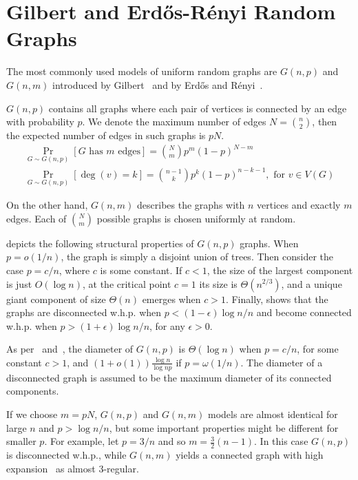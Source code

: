 \section{Gilbert and \texorpdfstring{Erd\H{o}s-R\'enyi}{Erdos-Renyi} Random Graphs}

The most commonly used models of uniform random graphs are $G(n,p)$ and $G(n,m)$
introduced by Gilbert~\cite{gil59} and by Erd\H{o}s and R\'enyi~\cite{er59}.

$G(n,p)$ contains all graphs where each pair of vertices
is connected by an edge with probability $p$.
We denote the maximum number of edges $N=\binom{n}{2}$,
then the expected number of edges in such graphs is $pN$.
\begin{gather}
    \Pr_{G\sim G(n,p)}[G\text{ has }m\text{ edges}]=\binom{N}{m}p^m(1-p)^{N-m}\\
    \Pr_{G\sim G(n,p)}[\deg(v)=k]=\binom{n-1}{k}p^k(1-p)^{n-k-1},\text{ for }v\in V(G)
\end{gather}

On the other hand, $G(n,m)$ describes the graphs with $n$ vertices and exactly $m$ edges.
Each of $\binom{N}{m}$ possible graphs is chosen uniformly at random.

\cite{er60} depicts the following structural properties of $G(n,p)$ graphs.
When $p=o(1/n)$, the graph is simply a disjoint union of trees.
Then consider the case $p=c/n$, where $c$ is some constant.
If $c<1$, the size of the largest component is just $O(\log n)$,
at the critical point $c=1$ its size is $\Theta\left(n^{2/3}\right)$,
and a unique giant component of size $\Theta(n)$ emerges when $c>1$.
Finally, \cite{er59} shows that the graphs are disconnected  w.h.p.
when $p<(1-\epsilon)\log n/n$ and become connected w.h.p.
when $p>(1+\epsilon)\log n/n$, for any $\epsilon>0$.

As per~\cite{cl01} and~\cite{cl04}, the diameter of $G(n,p)$ is
$\Theta(\log n)$ when $p=c/n$, for some constant $c>1$,
and $(1+o(1))\frac{\log n}{\log np}$ if $p=\omega(1/n)$.
The diameter of a disconnected graph is assumed to be the maximum
diameter of its connected components.


If we choose $m=pN$, $G(n,p)$ and $G(n,m)$ models are almost identical for large $n$
and $p>\log n/n$, but some important properties might be different for smaller $p$.
For example, let $p=3/n$ and so $m=\frac{3}{2}(n-1)$.
In this case $G(n,p)$ is disconnected w.h.p., while $G(n,m)$ yields
a connected graph with high expansion~\cite{mah09} as almost 3-regular.

